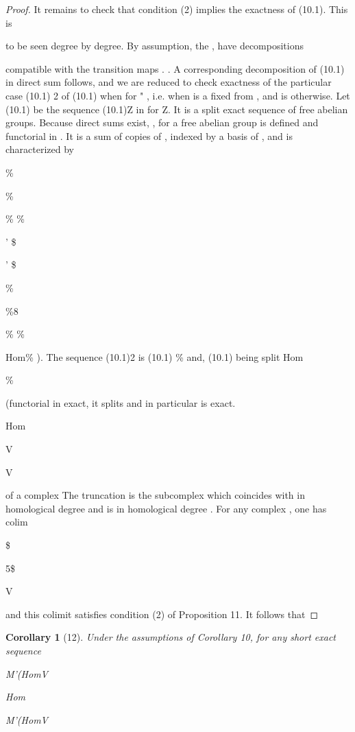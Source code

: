 \documentclass[11pt,a4paper]{article}
\theoremstyle{plain}
\newtheorem{corollary}[theorem]{Corollary}
\theoremstyle{definition}
\begin{document}
\begin{proof} It remains to check that condition (2) implies the exactness of (10.1). This is

to be seen degree by degree. By assumption, the 
 , have decompositions

compatible with the transition maps 
.   . A corresponding decomposition of (10.1) in direct sum follows, and we are reduced to check exactness of the
particular case (10.1) 2 of (10.1) when 
for " , i.e. when  is a fixed
from  , and is otherwise. Let (10.1) be the sequence (10.1)Z in
for
Z. It is a split exact sequence of free abelian groups. Because direct sums exist,
 , for a free abelian group is defined and functorial in . It is a sum of copies
of , indexed by a basis of , and is characterized by

\%

\%

\%
\%

' \$





' \$

\%

\%8

\%
\%

  Hom\% 
). The sequence (10.1)2 is (10.1)  \% and, (10.1) being split
Hom

  \% 

(functorial in
exact, it splits and in particular is exact.

Hom





V

V

 of a complex
The truncation 
is the subcomplex which coincides with in homological degree
and is in homological degree
. For
any complex , one has
colim 

\$



5\$

V

and this colimit satisfies condition (2) of Proposition 11. It follows that
\end{proof}

\begin{corollary}[12]
Under the assumptions of Corollary 10, for any
short exact sequence

 M'(HomV   

Hom

   M'(HomV    

\end{corollary}
\end{document}
